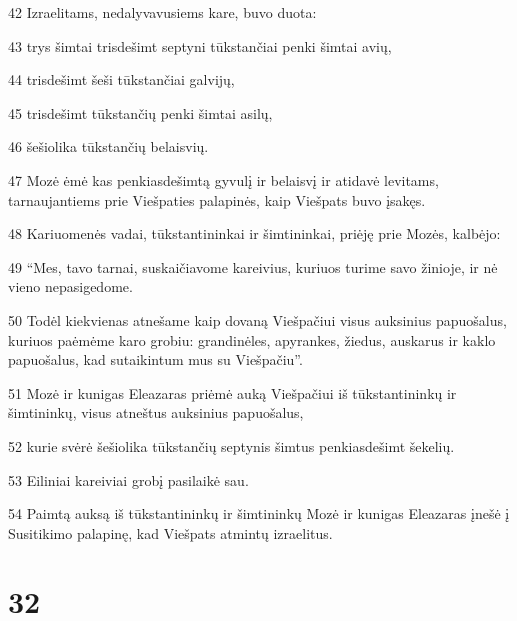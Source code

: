 \par 42 Izraelitams, nedalyvavusiems kare, buvo duota: 
\par 43 trys šimtai trisdešimt septyni tūkstančiai penki šimtai avių, 
\par 44 trisdešimt šeši tūkstančiai galvijų, 
\par 45 trisdešimt tūkstančių penki šimtai asilų, 
\par 46 šešiolika tūkstančių belaisvių. 
\par 47 Mozė ėmė kas penkiasdešimtą gyvulį ir belaisvį ir atidavė levitams, tarnaujantiems prie Viešpaties palapinės, kaip Viešpats buvo įsakęs. 
\par 48 Kariuomenės vadai, tūkstantininkai ir šimtininkai, priėję prie Mozės, kalbėjo: 
\par 49 “Mes, tavo tarnai, suskaičiavome kareivius, kuriuos turime savo žinioje, ir nė vieno nepasigedome. 
\par 50 Todėl kiekvienas atnešame kaip dovaną Viešpačiui visus auksinius papuošalus, kuriuos paėmėme karo grobiu: grandinėles, apyrankes, žiedus, auskarus ir kaklo papuošalus, kad sutaikintum mus su Viešpačiu”. 
\par 51 Mozė ir kunigas Eleazaras priėmė auką Viešpačiui iš tūkstantininkų ir šimtininkų, visus atneštus auksinius papuošalus, 
\par 52 kurie svėrė šešiolika tūkstančių septynis šimtus penkiasdešimt šekelių. 
\par 53 Eiliniai kareiviai grobį pasilaikė sau. 
\par 54 Paimtą auksą iš tūkstantininkų ir šimtininkų Mozė ir kunigas Eleazaras įnešė į Susitikimo palapinę, kad Viešpats atmintų izraelitus.



\chapter{32}


